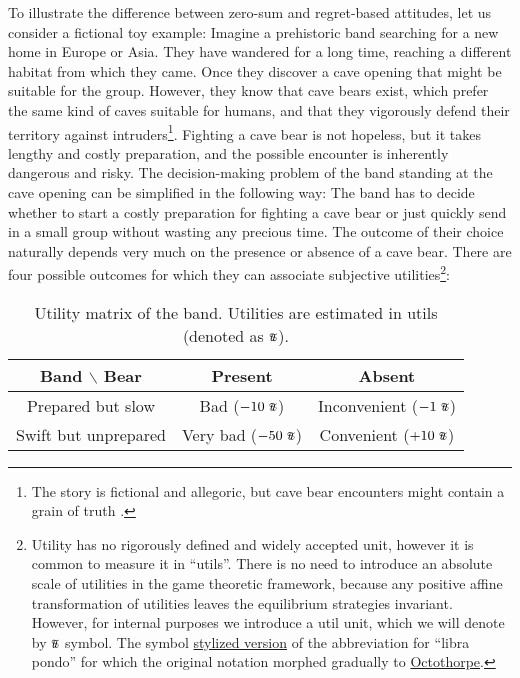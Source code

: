 \documentclass{article}
\newcommand{\util}{\scalebox{0.75}{\text{\Pfund}}}
\begin{document}
To illustrate the difference between zero-sum and regret-based attitudes, let us consider a fictional toy example:
Imagine a prehistoric band searching for a new home in Europe or Asia. They have wandered for a long time, reaching a different habitat from which they came. Once they discover a cave opening that might be suitable for the group. However, they know that cave bears exist, which prefer the same kind of caves suitable for humans, and that they vigorously defend their territory against intruders\footnote{The story is fictional and allegoric, but cave bear encounters might contain a grain of truth \cite{book:Bear,paper:CaveBear,book:PleistoceneMammals}.}.
Fighting a cave bear is not hopeless, but it takes lengthy and costly preparation, and the possible encounter is inherently dangerous and risky.
The decision-making problem of the band standing at the cave opening can be simplified in the following way:
The band has to decide whether to start a costly preparation for fighting a cave bear or just quickly send in a small group without wasting any precious time.
The outcome of their choice naturally depends very much on the presence or absence of a cave bear.
There are four possible outcomes for which they can associate subjective utilities\footnote{Utility has no rigorously defined and widely accepted unit, however it is common to measure it in ``utils''. There is no need to introduce an absolute scale of utilities in the game theoretic framework, because any positive affine transformation of utilities leaves the equilibrium strategies invariant. However, for internal purposes we introduce a util unit, which we will denote by $\util$ symbol. The symbol \href{https://en.wikipedia.org/wiki/Number_sign}{stylized version} of the abbreviation for ``libra pondo'' \cite{book:ShadyCharacters} for which the original notation morphed gradually to \href{https://www.newyorker.com/books/page-turner/the-ancient-roots-of-punctuation}{Octothorpe}.}:


\begin{table}[h!]
    \centering
    \begin{tabular}{c|cc}
        Band $\backslash$ Bear & Present & Absent \\
        \hline
        Prepared but slow & Bad ($-10\ \util$) & Inconvenient ($-1\ \util$) \\
        Swift but unprepared & Very bad ($-50\ \util$) & Convenient ($+10\ \util$) \\
    \end{tabular}
    \caption{Utility matrix of the band. Utilities are estimated in utils (denoted as $\util$).}
    \label{tab:BandBearUtilityMatrix}
\end{table}
\end{document}
